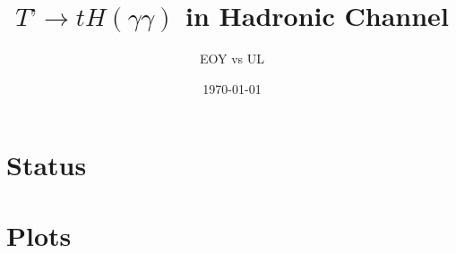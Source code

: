 \documentclass[usenames,dvipsnames]{beamer} %
\title{$T’ \to tH(\gamma\gamma)$ in Hadronic Channel}
\subtitle{EOY vs UL}
\date{\today}
\begin{document}
\frame{\titlepage}

\section{Status}



\section{Plots}
























































































\end{document}

